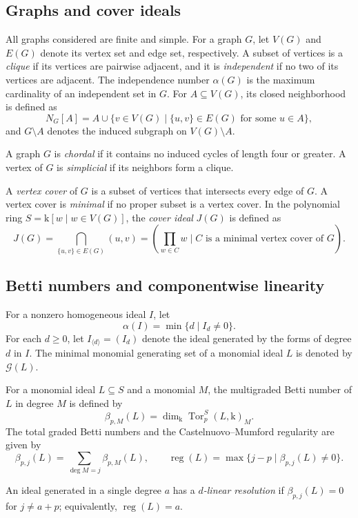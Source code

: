 \documentclass[12pt]{amsart}
\theoremstyle{definition}
\theoremstyle{remark}
\DeclareMathOperator{\reg}{reg}
\newcommand{\kk}{\mathrm{k}}
\newcommand{\Gens}{\mathcal G}
\begin{document}
\subsection{Graphs and cover ideals}

All graphs considered are finite and simple. For a graph $G$, let $V(G)$ and $E(G)$ denote its vertex set and edge set, respectively. A subset of vertices is a \emph{clique} if its vertices are pairwise adjacent, and it is \emph{independent} if no two of its vertices are adjacent. The independence number $\alpha(G)$ is the maximum cardinality of an independent set in $G$. For $A \subseteq V(G)$, its closed neighborhood is defined as
\[
N_G[A] = A \cup \{v \in V(G) \mid \{u, v\} \in E(G) \text{ for some } u \in A\},
\]
and $G \setminus A$ denotes the induced subgraph on $V(G) \setminus A$.

A graph $G$ is \emph{chordal} if it contains no induced cycles of length four or greater. A vertex of $G$ is \emph{simplicial} if its neighbors form a clique.

A \emph{vertex cover} of $G$ is a subset of vertices that intersects every edge of $G$. A vertex cover is \emph{minimal} if no proper subset is a vertex cover. In the polynomial ring $S = \kk[w \mid w \in V(G)]$, the \emph{cover ideal} $J(G)$ is defined as
\[
J(G) = \bigcap_{\{u,v\} \in E(G)} (u, v) = \left( \prod_{w \in C} w \;\Bigg|\; C \text{ is a minimal vertex cover of } G \right).
\]

\subsection{Betti numbers and componentwise linearity}
For a nonzero homogeneous ideal $I$, let
\[
\alpha(I) = \min\{d \mid I_d \neq 0\}.
\]
For each $d \ge 0$, let $I_{\langle d \rangle} = (I_d)$ denote the ideal generated by the forms of degree $d$ in $I$. The minimal monomial generating set of a monomial ideal $L$ is denoted by $\Gens(L)$. 

For a monomial ideal $L \subseteq S$ and a monomial $M$, the multigraded Betti number of $L$ in degree $M$ is defined by
\[
\beta_{p,M}(L) = \dim_{\mathrm{k}} \operatorname{Tor}_p^S(L, \mathrm{k})_M.
\]
The total graded Betti numbers and the Castelnuovo--Mumford regularity are given by
\[
\beta_{p,j}(L) = \sum_{\deg M = j} \beta_{p,M}(L), \qquad \reg(L) = \max\{j - p \mid \beta_{p,j}(L) \neq 0\}.
\]

An ideal generated in a single degree $a$ has a \emph{$d$-linear resolution} if $\beta_{p,j}(L) = 0$ for $j \neq a + p$; equivalently, $\reg(L) = a$.
\end{document}
